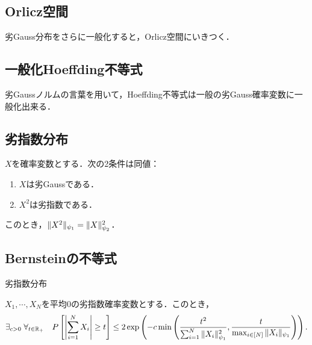 \documentclass[uplatex,dvipdfmx]{jsreport}
\begin{document}
\subsection{Orlicz空間}

\begin{tcolorbox}[colframe=ForestGreen, colback=ForestGreen!10!white,breakable,colbacktitle=ForestGreen!40!white,coltitle=black,fonttitle=\bfseries\sffamily,
title=]
    劣Gauss分布をさらに一般化すると，Orlicz空間にいきつく．
\end{tcolorbox}

\subsection{一般化Hoeffding不等式}

\begin{tcolorbox}[colframe=ForestGreen, colback=ForestGreen!10!white,breakable,colbacktitle=ForestGreen!40!white,coltitle=black,fonttitle=\bfseries\sffamily,
title=]
    劣Gaussノルムの言葉を用いて，Hoeffding不等式は一般の劣Gauss確率変数に一般化出来る．
\end{tcolorbox}

\subsection{劣指数分布}

\begin{lemma}
    $X$を確率変数とする．次の2条件は同値：
    \begin{enumerate}
        \item $X$は劣Gaussである．
        \item $X^2$は劣指数である．
    \end{enumerate}
    このとき，$\|X^2\|_{\psi_1}=\|X\|^2_{\psi_2}$．
\end{lemma}

\subsection{Bernsteinの不等式}

\begin{tcolorbox}[colframe=ForestGreen, colback=ForestGreen!10!white,breakable,colbacktitle=ForestGreen!40!white,coltitle=black,fonttitle=\bfseries\sffamily,
title=]
    劣指数分布
\end{tcolorbox}

\begin{theorem}
    $X_1,\cdots,X_N$を平均$0$の劣指数確率変数とする．このとき，
    \[\exists_{c>0}\;\forall_{t\in\mathbb{R}_+}\quad P\left[\left|\sum^N_{i=1}X_i\right|\ge t\right]\le 2\exp\left(-c\min\left(\frac{t^2}{\sum^N_{i=1}\|X_i\|^2_{\psi_1}},\frac{t}{\max_{i\in[N]}\|X_i\|_{\psi_1}}\right)\right).\]
\end{theorem}
\end{document}
